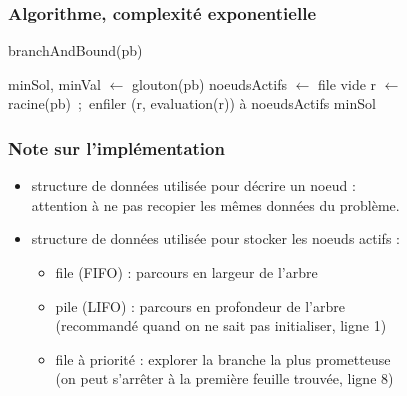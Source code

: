 \documentclass{beamer}
\begin{document}
\begin{frame}
  \frametitle{Algorithme, complexité exponentielle}

  {\footnotesize%
    
  \begin{algorithm}[H]
    \caption{branchAndBound(pb)}
    \label{alg:brancheAndBound}
    minSol, minVal $\leftarrow$ glouton(pb) 
    noeudsActifs $\leftarrow$ file vide \;
    r $\leftarrow$ racine(pb)~;~enfiler (r, evaluation(r)) à noeudsActifs \; 
    \Return minSol
  \end{algorithm}
  }
  
\end{frame}

\begin{frame}
  \frametitle{Note sur l'implémentation}

  \begin{itemize}
  \item structure de données utilisée pour décrire un noeud : \\
    attention à ne pas recopier les mêmes données du problème.
  \item structure de données utilisée pour stocker les noeuds actifs :
    \begin{itemize}
    \item file (FIFO) : parcours en largeur de l'arbre
    \item pile (LIFO) : parcours en profondeur de l'arbre \\
      (recommandé quand on ne sait pas initialiser, ligne 1)
    \item file à priorité : explorer la branche la plus prometteuse \\
      (on peut s'arrêter à la première feuille trouvée, ligne 8) 
    \end{itemize}
  \end{itemize}
\end{frame}
\end{document}
